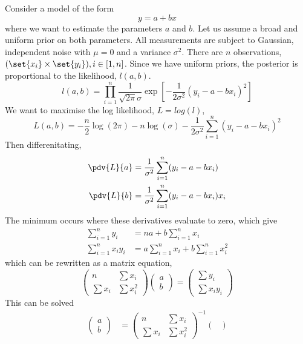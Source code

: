 \documentclass{dwnotes}         		        %
\begin{document}
\begin{example}
  Consider a model of the form
  \[ y = a + bx \] where we want to estimate the parameters $a$ and
  $b$. Let us assume a broad and uniform prior on both parameters. All
  measurements are subject to Gaussian, independent noise with $\mu=0$
  and a variance $\sigma^2$. There are $n$ observations, $(\set{x_i}
  \times \set{y_i}), i \in [1,n]$.  Since we have uniform priors, the
  posterior is proportional to the likelihood, $l(a,b)$.
  \[ l(a,b) = \prod_{i=1}^n \frac{1}{\sqrt{2 \pi} \sigma} \exp[ -
  \frac{1}{2 \sigma^2} (y_i - a - bx_i)^2 ] \] We want to maximise the
  log likelihood, $L = log(l)$,
  \[ L(a,b) = - \frac{n}{2} \log(2 \pi) - n \log(\sigma) - \frac{1}{2
    \sigma^2} \sum_{i=1}^n (y_i - a - bx_i)^2 \] Then differenitating,
\begin{align*} 
\pdv{L}{a} &= \frac{1}{\sigma^2} \sum_{i=1}^n (y_i - a - bx_i) \\
\pdv{L}{b} &= \frac{1}{\sigma^2} \sum_{i=1}^n (y_i - a - bx_i)x_i
\end{align*}
The minimum occurs where these derivatives evaluate to zero, which give
\begin{align*}
  \sum_{i=1}^n y_i& = na + b \sum_{i=1}^n x_i \\
\sum_{i=1}^n x_i y_i &= a \sum_{i=1}^n x_i + b \sum_{i=1}^n x^2_i
\end{align*}
which can be rewritten as a matrix equation,
\begin{equation*}
  \begin{pmatrix}
    n & \sum x_i \\ \sum x_i & \sum x_i^2
  \end{pmatrix}
  \begin{pmatrix}
    a \\ b
  \end{pmatrix}
=
\begin{pmatrix}
  \sum y_i \\ \sum x_i y_i
\end{pmatrix}
\end{equation*}
This can be solved
\begin{align*}
  \begin{pmatrix}
    a \\ b
  \end{pmatrix} &=
  \begin{pmatrix}
    n & \sum x_i \\ \sum x_i & \sum x_i^2
  \end{pmatrix}^{-1}
  \begin{pmatrix}

\end{pmatrix}
\end{align*}
\end{example}
\end{document}
